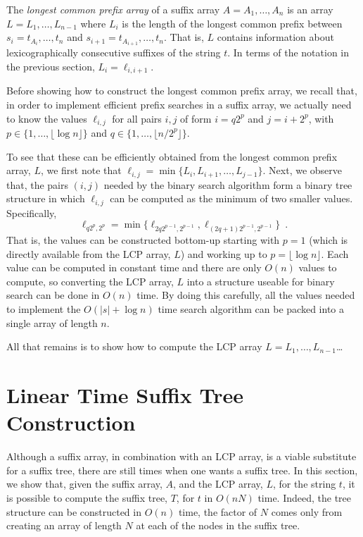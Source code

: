 The \emph{longest common prefix array} of a suffix array $A=A_1,\ldots,A_n$ is an array $L=L_1,\ldots,L_{n-1}$ where $L_i$ is the length of the longest common prefix between $s_i=t_{A_i},\ldots,t_n$ and $s_{i+1}=t_{A_{i+1}},\ldots,t_n$.  That is, $L$ contains information about lexicographically consecutive suffixes of the string $t$.  In terms of the notation in the previous section, $L_i=\ell_{i,i+1}$.

Before showing how to construct the longest common prefix array, we recall that, in order to implement efficient prefix searches in a suffix array, we actually need to know the values $\ell_{i,j}$ for all pairs $i,j$ of form 
$i=q2^p$ and $j=i+2^{p}$, with $p\in\{1,\ldots,\lfloor \log n\rfloor\}$ and $q\in\{1,\ldots,\lfloor n/2^p\rfloor\}$.

To see that these can be efficiently obtained from the longest common prefix array, $L$, we first note that $\ell_{i,j}=\min\{L_i,L_{i+1},\ldots,L_{j-1}\}$.
Next, we observe that, the pairs $(i,j)$ needed by the binary search algorithm form a binary tree structure in which $\ell_{i,j}$ can be computed as the minimum of two smaller values.  Specifically,
\[
    \ell_{q2^p,2^{p}} = \min\{\ell_{2q 2^{p-1},2^{p-1}}, \ell_{(2q+1) 2^{p-1},2^{p-1}}\} \enspace .
\]
That is, the values can be constructed bottom-up starting with $p=1$ (which is directly available from the LCP array, $L$) and working up to $p=\lfloor\log n\rfloor$.  Each value can be computed in constant time and there are only $O(n)$ values to compute, so converting the LCP array, $L$ into a structure useable for binary search can be done in $O(n)$ time.  By doing this carefully, all the values needed to implement the $O(|s|+\log n)$ time search algorithm can be packed into a single array of length $n$.

All that remains is to show how to compute the LCP array $L=L_1,\ldots,L_{n-1}$\ldots

\section{Linear Time Suffix Tree Construction}

Although a suffix array, in combination with an LCP array, is a viable substitute for a suffix tree, there are still times when one wants a suffix tree.  In this section, we show that, given the suffix array, $A$, and the LCP array, $L$, for the string $t$, it is possible to compute the suffix tree, $T$, for $t$ in $O(nN)$ time.  Indeed, the tree structure can be constructed in $O(n)$ time, the factor of $N$ comes only from creating an array of length $N$ at each of the nodes in the suffix tree.

